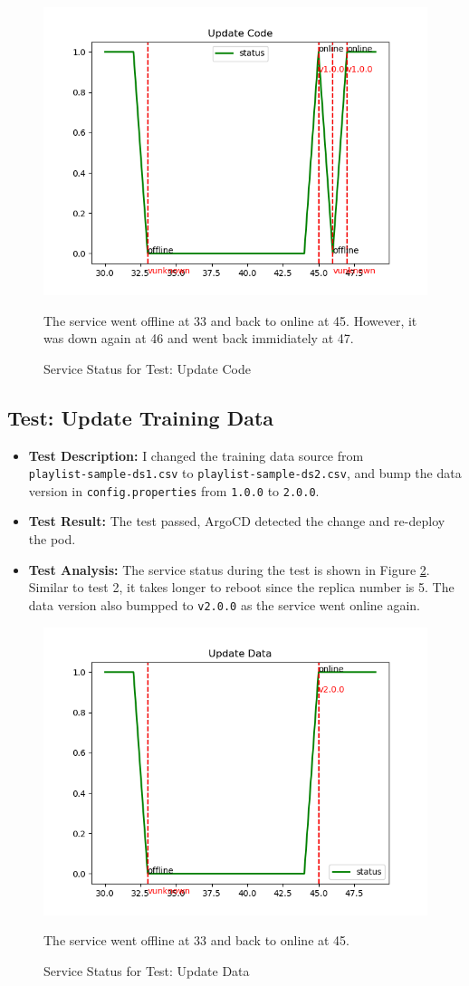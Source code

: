\documentclass[12pt]{article}
\begin{document}
\begin{figure}[!htbp]
    \centering
    \includegraphics[width=.75\textwidth]{../code/figures/update_code.png}
    \caption{Service Status for Test: Update Code}
    \label{fig:update_code}
    \medskip
    \small
    The service went offline at 33 and back to online at 45. However, it was down again at 46 and went back immidiately at 47.
\end{figure}

\subsection{Test: Update Training Data}

\begin{itemize}
    \item \textbf{Test Description:} I changed the training data source from\\ \texttt{playlist-sample-ds1.csv} to \texttt{playlist-sample-ds2.csv}, and bump the data version in \texttt{config.properties} from \texttt{1.0.0} to \texttt{2.0.0}.
    \item \textbf{Test Result:} The test passed, ArgoCD detected the change and re-deploy the pod.
    \item \textbf{Test Analysis:} The service status during the test is shown in Figure \ref{fig:update_data}. Similar to test 2, it takes longer to reboot since the replica number is 5. The data version also bumpped to \texttt{v2.0.0} as the service went online again.
\end{itemize}

\begin{figure}[!htbp]
    \centering
    \includegraphics[width=.75\textwidth]{../code/figures/update_data.png}
    \caption{Service Status for Test: Update Data}
    \label{fig:update_data}
    \medskip
    \small
    The service went offline at 33 and back to online at 45.
\end{figure}
\end{document}
